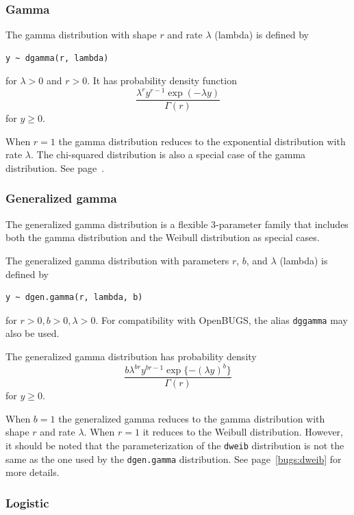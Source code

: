 \documentclass[11pt, a4paper, titlepage]{report}
\begin{document}
{\subsubsection{Gamma}
\label{bugs:dgamma}

The gamma distribution with shape $r$ and rate $\lambda$ (lambda) is
defined by
\begin{verbatim}
y ~ dgamma(r, lambda)
\end{verbatim}
for $\lambda > 0$ and $r > 0$. It has probability density function
\[
\frac{\textstyle \lambda^r y^{r - 1} \exp(-\lambda y)}
     {\textstyle \Gamma(r)}
\]
for $y \geq 0$.

When $r=1$ the gamma distribution reduces to the exponential distribution
with rate $\lambda$. The chi-squared distribution is also a special case
of the gamma distribution. See page~\pageref{bugs:dchisqr}.

\subsubsection{Generalized gamma}      
\label{bugs:dgen.gamma}

The generalized gamma distribution is a flexible 3-parameter family
that includes both the gamma distribution and the Weibull distribution
as special cases.

The generalized gamma distribution with parameters $r$, $b$, and
$\lambda$ (lambda) is defined by
\begin{verbatim}
y ~ dgen.gamma(r, lambda, b)
\end{verbatim}
for $r > 0, b > 0, \lambda > 0$. For compatibility with OpenBUGS, the
alias \texttt{dggamma} may also be used.

The generalized gamma distribution has probability density
\[
\frac{\textstyle b \lambda^{b r} y^{b r - 1}  \exp\{-(\lambda y)^{b}\}}
     {\textstyle \Gamma(r)}
\]
for $y \geq 0$.

When $b=1$ the generalized gamma reduces to the gamma distribution
with shape $r$ and rate $\lambda$. When $r=1$ it reduces to the
Weibull distribution. However, it should be noted that the
parameterization of the \texttt{dweib} distribution is not the same as
the one used by the \texttt{dgen.gamma} distribution. See
page~\ref{bugs:dweib} for more details.

\subsubsection{Logistic}
\label{bugs:dlogis}

}
\end{document}
